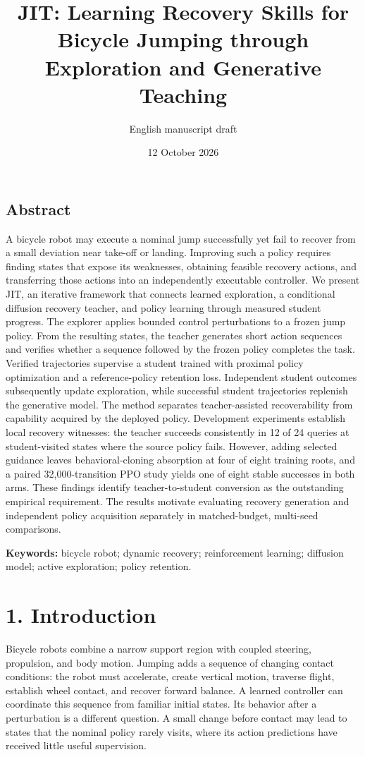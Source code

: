 \documentclass[
  american,
  11pt,
  a4paper,
]{article}
\title{JIT: Learning Recovery Skills for Bicycle Jumping through
Exploration and Generative Teaching}
\subtitle{English manuscript draft}
\author{}
\date{12 October 2026}
\begin{document}
\maketitle

\subsection{Abstract}\label{abstract}

A bicycle robot may execute a nominal jump successfully yet fail to
recover from a small deviation near take-off or landing. Improving such
a policy requires finding states that expose its weaknesses, obtaining
feasible recovery actions, and transferring those actions into an
independently executable controller. We present JIT, an iterative
framework that connects learned exploration, a conditional diffusion
recovery teacher, and policy learning through measured student progress.
The explorer applies bounded control perturbations to a frozen jump
policy. From the resulting states, the teacher generates short action
sequences and verifies whether a sequence followed by the frozen policy
completes the task. Verified trajectories supervise a student trained
with proximal policy optimization and a reference-policy retention loss.
Independent student outcomes subsequently update exploration, while
successful student trajectories replenish the generative model. The
method separates teacher-assisted recoverability from capability
acquired by the deployed policy. Development experiments establish local
recovery witnesses: the teacher succeeds consistently in 12 of 24
queries at student-visited states where the source policy fails.
However, adding selected guidance leaves behavioral-cloning absorption
at four of eight training roots, and a paired 32,000-transition PPO
study yields one of eight stable successes in both arms. These findings
identify teacher-to-student conversion as the outstanding empirical
requirement. The results motivate evaluating recovery generation and
independent policy acquisition separately in matched-budget, multi-seed
comparisons.

\textbf{Keywords:} bicycle robot; dynamic recovery; reinforcement
learning; diffusion model; active exploration; policy retention.

\section{1. Introduction}\label{introduction}

Bicycle robots combine a narrow support region with coupled steering,
propulsion, and body motion. Jumping adds a sequence of changing contact
conditions: the robot must accelerate, create vertical motion, traverse
flight, establish wheel contact, and recover forward balance. A learned
controller can coordinate this sequence from familiar initial states.
Its behavior after a perturbation is a different question. A small
change before contact may lead to states that the nominal policy rarely
visits, where its action predictions have received little useful
supervision.
\end{document}
